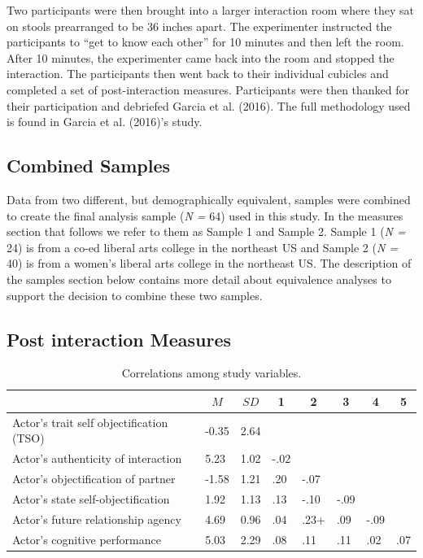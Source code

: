 \documentclass[man]{apa6}
\begin{document}
Two participants were then brought into a larger interaction room where
they sat on stools prearranged to be 36 inches apart. The experimenter
instructed the participants to \enquote{get to know each other} for 10
minutes and then left the room. After 10 minutes, the experimenter came
back into the room and stopped the interaction. The participants then
went back to their individual cubicles and completed a set of
post-interaction measures. Participants were then thanked for their
participation and debriefed Garcia et al. (2016). The full methodology
used is found in Garcia et al. (2016)'s study.

\subsection{Combined Samples}\label{combined-samples}

Data from two different, but demographically equivalent, samples were
combined to create the final analysis sample (\emph{N =} 64) used in
this study. In the measures section that follows we refer to them as
Sample 1 and Sample 2. Sample 1 (\emph{N =} 24) is from a co-ed liberal
arts college in the northeast US and Sample 2 (\emph{N =} 40) is from a
women's liberal arts college in the northeast US. The description of the
samples section below contains more detail about equivalence analyses to
support the decision to combine these two samples.

\subsection{Post interaction Measures}\label{post-interaction-measures}

\begin{table}[tbp]
\begin{center}
\begin{threeparttable}
\caption{\label{tab:corrtable}Correlations among study variables.}
\begin{tabular}{llllllll}
\toprule
 & \multicolumn{1}{c}{$M$} & \multicolumn{1}{c}{$SD$} & \multicolumn{1}{c}{1} & \multicolumn{1}{c}{2} & \multicolumn{1}{c}{3} & \multicolumn{1}{c}{4} & \multicolumn{1}{c}{5}\\
\midrule
Actor's trait self objectification (TSO) & -0.35 & 2.64 &  &  &  &  & \\
Actor's authenticity of interaction & 5.23 & 1.02 & -.02 &  &  &  & \\
Actor's objectification of partner & -1.58 & 1.21 & .20 & -.07 &  &  & \\
Actor's state self-objectification & 1.92 & 1.13 & .13 & -.10 & -.09 &  & \\
Actor's future relationship agency & 4.69 & 0.96 & .04 & .23+ & .09 & -.09 & \\
Actor's cognitive performance & 5.03 & 2.29 & .08 & .11 & .11 & .02 & .07\\
\bottomrule
\end{tabular}
\end{threeparttable}
\end{center}
\end{table}
\end{document}
